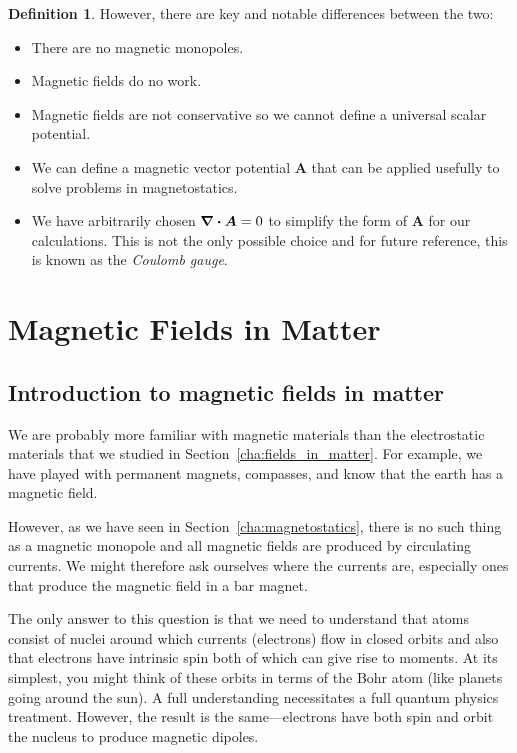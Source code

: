 \documentclass[12pt,chapterprefix=false,dvipsnames]{scrbook}
\theoremstyle{dotless}
\theoremstyle{definition}
\newtheorem{protodefinition}{Definition}[section]
\newenvironment{definition}
{\colorlet{shadecolor}{black!15}\begin{shaded}\begin{protodefinition}}
			{\end{protodefinition}\end{shaded}}
\begin{document}
\begin{definition}
	However, there are key and notable differences between the two:
	\begin{itemize}
		\item There are no magnetic monopoles.
		\item Magnetic fields do no work.
		\item Magnetic fields are not conservative so we cannot define a
		      universal scalar potential.
		\item We can define a magnetic vector potential $\bm{A}$
		      that can be applied usefully to solve problems in
		      magnetostatics.
		\item We have arbitrarily chosen $\divergence{\bm{A}} = 0$ to simplify
		      the form of $\bm{A}$ for our calculations. This is
		      not the only possible choice and for future reference, this is
		      known as the \textit{Coulomb gauge}.
	\end{itemize}
\end{definition}

\chapter{Magnetic Fields in Matter}%
\label{cha:magnetic_fields_in_matter}

\section{Introduction to magnetic fields in matter}%
\label{sec:introduction_to_magnetic_fields_in_matter}

We are probably more familiar with magnetic materials than the
electrostatic materials that we studied in
Section~\ref{cha:fields_in_matter}. For example, we have played
with permanent magnets, compasses, and know that the earth has a
magnetic field.

However, as we have seen in Section~\ref{cha:magnetostatics},
there is no such thing as a magnetic monopole and all magnetic
fields are produced by circulating currents. We might therefore
ask ourselves where the currents are, especially ones that
produce the magnetic field in a bar magnet.

The only answer to this question is that we need to understand
that atoms consist of nuclei around which currents (electrons)
flow in closed orbits and also that electrons have intrinsic
spin both of which can give rise to moments. At its simplest,
you might think of these orbits in terms of the Bohr atom (like
planets going around the sun). A full understanding necessitates
a full quantum physics treatment. However, the result is the
same---electrons have both spin and orbit the nucleus to produce
magnetic dipoles.
\end{document}
